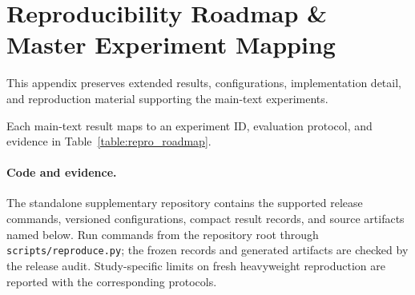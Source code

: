 \newpage
\appendix
\onecolumn
\raggedbottom
\renewcommand{\theHsection}{app.\Alph{section}}
\renewcommand{\theHtable}{app.tbl.\thesection.\arabic{table}}
\renewcommand{\theHfigure}{app.fig.\thesection.\arabic{figure}}

\section{Reproducibility Roadmap \& Master Experiment Mapping}
\label{app:repro_map}

This appendix preserves extended results, configurations, implementation detail, and reproduction material supporting the main-text experiments.

Each main-text result maps to an experiment ID, evaluation protocol, and evidence in Table~\ref{table:repro_roadmap}.

\paragraph{Code and evidence.}
The standalone supplementary repository contains the supported release commands, versioned configurations, compact result records, and source artifacts named below. Run commands from the repository root through \texttt{scripts/reproduce.py}; the frozen records and generated artifacts are checked by the release audit. Study-specific limits on fresh heavyweight reproduction are reported with the corresponding protocols.

